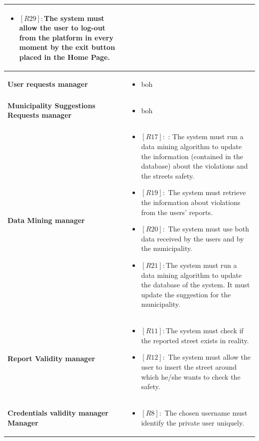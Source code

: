 \documentclass[titlepage]{article}
\begin{document}
\begin{longtable}{| p{7 cm} | p{8 cm} |}
\begin{itemize}
		 \item \textbf{$[R29]:$}The system must allow the user to log-out from the platform in every moment by the exit button placed in the Home Page. 
	\end{itemize} \\ \hline
		\newline \textbf {User requests manager} &
		\begin{itemize}
			\item boh
		\end{itemize} \\ \hline
		\newline \textbf {Municipality Suggestions Requests manager} &
		\begin{itemize}
			\item boh
		\end{itemize} \\ \hline
		\newline \textbf {Data Mining manager} &
		\begin{itemize}
			\item \textbf{$[R17]:$} : The system must run a data mining algorithm to update the information (contained in the database) about the violations and the streets safety. 
			\item \textbf{$[R19]:$} The system must retrieve the information about violations from the users' reports. 
			\item \textbf{$[R20]:$} The system must use both data received by the users and by the municipality. 
			\item \textbf{$[R21]:$}The system must run a data mining algorithm to update the database of the system. It must update the suggestion for the municipality. 
		\end{itemize} \\ \hline
		\newline \textbf {Report Validity manager} &
		\begin{itemize}
			\item \textbf{$[R11]:$}The system must check if the reported street exists in reality. 
			\item \textbf{$[R12]:$} The system must allow the user to insert the street around which he/she wants to check the safety. 
		\end{itemize} \\ \hline
		\newline \textbf {Credentials validity manager Manager} &
		\begin{itemize}
			\item \textbf{$[R8]:$} The chosen username must identify the private user uniquely. 

\end{itemize}
\end{longtable}
\end{document}
